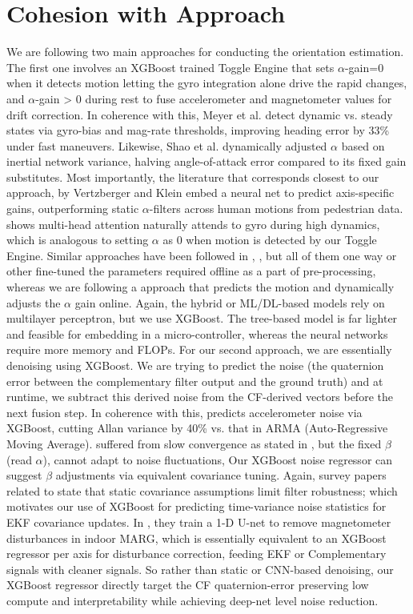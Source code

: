\documentclass{iutbscthesis}
\begin{document}
\section{Cohesion with Approach}
We are following two main approaches for conducting the orientation estimation. The first one involves an XGBoost trained Toggle Engine that sets $\alpha$-gain=0 when it detects motion letting the gyro integration alone drive the rapid changes, and $\alpha$-gain > 0 during rest to fuse accelerometer and magnetometer values for drift correction. In coherence with this, Meyer et al. \cite{CEAS-GNC-2019-036} detect dynamic vs. steady states via gyro-bias and mag-rate thresholds, improving heading error by 33\% under fast maneuvers. Likewise, Shao et al. \cite{shao2023variablegainflushsesnsing} dynamically adjusted $\alpha$ based on inertial network variance, halving angle-of-attack error compared to its fixed gain substitutes. Most importantly, the literature that corresponds closest to our approach, \cite{vertzberger2022adaptive} by Vertzberger and Klein embed a neural net to predict axis-specific gains, outperforming static $\alpha$-filters across human motions from pedestrian data. \cite{tedaldi2014multihead} shows multi-head attention naturally attends to gyro during high dynamics, which is analogous to setting $\alpha$ as 0 when motion is detected by our Toggle Engine. Similar approaches have been followed in \cite{georgiou2013linearnonlinear}, \cite{bettermadg}, \cite{golroudbari2023cnn6DOF} but all of them one way or other fine-tuned the parameters required offline as a part of pre-processing, whereas we are following a approach that predicts the motion and dynamically adjusts the $\alpha$ gain online. Again, the hybrid or ML/DL-based models rely on multilayer perceptron, but we use XGBoost. The tree-based model is far lighter and feasible for embedding in a micro-controller, whereas the neural networks require more memory and FLOPs. 
For our second approach, we are essentially denoising using XGBoost. We are trying to predict the noise (the quaternion error between the complementary filter output and the ground truth)  and at runtime, we subtract this derived noise from the CF-derived vectors before the next fusion step. In coherence with this, \cite{wang2020mems} predicts accelerometer noise via XGBoost, cutting Allan variance by 40\% vs. that in ARMA (Auto-Regressive Moving Average). \cite{extendedMADG} suffered from slow convergence  as stated in \cite{madgwick2011estimation}, but the fixed $\beta$ (read $\alpha$), cannot adapt to noise fluctuations, Our XGBoost noise regressor can suggest $\beta$ adjustments via equivalent covariance tuning. Again, survey papers related to \cite{EKF} state that static covariance assumptions limit filter robustness; which motivates our use of XGBoost for predicting time-variance noise statistics for EKF covariance updates. In \cite{wang2020mems}, they train a 1-D U-net to remove magnetometer disturbances in indoor MARG, which is essentially equivalent to an XGBoost regressor per axis for disturbance correction, feeding EKF or Complementary signals with cleaner signals. So rather than static or CNN-based denoising, our XGBoost regressor directly target the CF quaternion-error preserving low compute and interpretability while achieving deep-net level noise reduction. 
\end{document}
